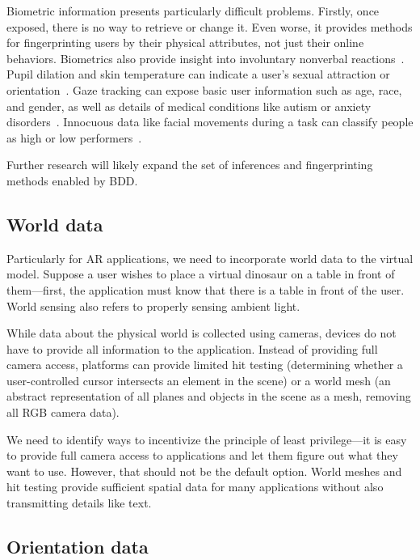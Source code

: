 Biometric information presents particularly difficult problems. Firstly, once exposed, there is no way to retrieve or change it. Even worse, it provides methods for fingerprinting users by their physical attributes, not just their online behaviors. Biometrics also provide insight into involuntary nonverbal reactions~\cite{bailenson2018protecting}. Pupil dilation and skin temperature can indicate a user's sexual attraction or orientation~\cite{bolmont2014love}. Gaze tracking can expose basic user information such as age, race, and gender, as well as details of medical conditions like autism or anxiety disorders~\cite{liebling2014privacy}. Innocuous data like facial movements during a task can classify people as high or low performers~\cite{jabon2011automatically}.

Further research will likely expand the set of inferences and fingerprinting methods enabled by BDD.

\subsection{World data}

Particularly for AR applications, we need to incorporate world data to the virtual model. Suppose a user wishes to place a virtual dinosaur on a table in front of them---first, the application must know that there is a table in front of the user. World sensing also refers to properly sensing ambient light.

While data about the physical world is collected using cameras, devices do not have to provide all information to the application. Instead of providing full camera access, platforms can provide limited hit testing (determining whether a user-controlled cursor intersects an element in the scene) or a world mesh (an abstract representation of all planes and objects in the scene as a mesh, removing all RGB camera data).

We need to identify ways to incentivize the principle of least privilege---it is easy to provide full camera access to applications and let them figure out what they want to use. However, that should not be the default option. World meshes and hit testing provide sufficient spatial data for many applications without also transmitting details like text.

\subsection{Orientation data}

